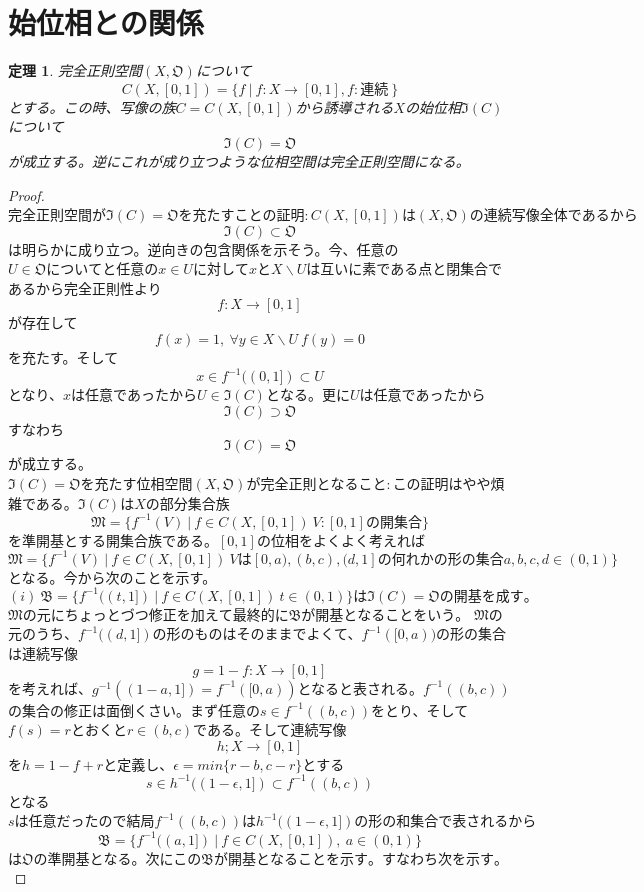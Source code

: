 \documentclass[leqno]{jsarticle}
\newtheorem{thm}{定理}
\begin{document}
\section{始位相との関係}
\begin{thm}完全正則空間$(X,\mathfrak{O})$について
\[
C(X,[0,1])=\{f\ |\ f:X\rightarrow [0,1],f:連続\ \}
\]
とする。この時、写像の族$C=C(X,[0,1])$から誘導される$X$の始位相$\mathfrak{I}(C)$について
\[
\mathfrak{I}(C)=\mathfrak{O}
\]
が成立する。逆にこれが成り立つような位相空間は完全正則空間になる。
\end{thm}
\begin{proof}
$完全正則空間が\mathfrak{I}(C)=\mathfrak{O}を充たすことの証明:C(X,[0,1])は(X,\mathfrak{O})の連続写像全体であるから$\[\mathfrak{I}(C)\subset \mathfrak{O}\]は明らかに成り立つ。逆向きの包含関係を示そう。今、任意の$U\in\mathfrak{O}についてと任意のx\in Uに対してxとX\backslash Uは$互いに素である点と閉集合であるから完全正則性より\[f:X\rightarrow [0,1]\]が存在して\[f(x)=1,\ \forall y\in X\backslash U\ f(y)=0\]を充たす。そして\[
x\in f^{-1}((0,1])\subset U
\]となり、$xは任意であったからU\in \mathfrak{I}(C)となる。更にUは任意であったから$
\[
\mathfrak{I}(C)\supset \mathfrak{O}
\]すなわち
\[
\mathfrak{I}(C)=\mathfrak{O}
\]が成立する。\\
$\mathfrak{I}(C)=\mathfrak{O}を充たす位相空間(X,\mathfrak{O})が完全正則となること:$この証明はやや煩雑である。$\mathfrak{I}(C)はXの部分集合族$\[
\mathfrak{M}=\{f^{-1}(V)\ |\ f\in C(X,[0,1])\ V:[0,1]の開集合\}
\]$を準開基とする開集合族である。[0,1]の位相をよくよく考えれ$ば\[
\mathfrak{M}=\{f^{-1}(V)\ |\ f\in C(X,[0,1])\ Vは[0,a),(b,c),(d,1]の何れかの形の集合a,b,c,d\in(0,1)\}
\]となる。今から次のことを示す。\[
(i)\ \mathfrak{B}=\{f^{-1}((t,1])\ |\ f\in C(X,[0,1])\ t\in (0,1)\}は\mathfrak{I}(C)=\mathfrak{O}の開基を成す。
\]$\mathfrak{M}の元にちょっとづつ修正を加えて最終的に\mathfrak{B}が開基となることをいう。$
$\mathfrak{M}$の元のうち、$f^{-1}((d,1])$の形のものはそのままでよくて、$f^{-1}([0,a))$の形の集合は連続写像
\[
g=1-f:X\rightarrow [0,1]
\]を考えれば、$g^{-1}((1-a,1])=f^{-1}([0,a))$となると表される。$f^{-1}((b,c))$の集合の修正は面倒くさい。まず任意の$s\in f^{-1}((b,c))$をとり、そして$f(s)=r$とおくと$r\in (b,c)$である。そして連続写像
\[
h;X\rightarrow [0,1]
\] を$h=1-f+rと定義し、\epsilon =min\{r-b,c-r\}とする$
\[
s\in h^{-1}((1-\epsilon ,1])\subset f^{-1}((b,c))
\]となる$sは任意だったので結局f^{-1}((b,c))は h^{-1}((1-\epsilon ,1])の形の和集合で表されるから$
\[
\mathfrak{B}=\{f^{-1}((a,1])\ |\ f\in C(X,[0,1]),\ a\in (0,1)\}
\]は$\mathfrak{O}の準開基となる。$次にこの$\mathfrak{B}が開基となることを示す。すなわち次を示す。$

\end{proof}
\end{document}
